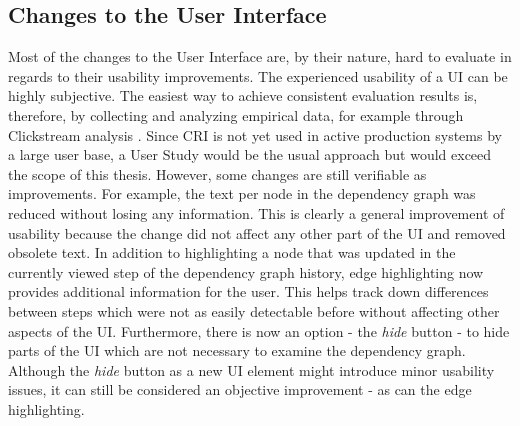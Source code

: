 	\subsection{Changes to the User Interface}
	Most of the changes to the User Interface are, by their nature, hard to evaluate in regards to their usability improvements. The experienced usability of a UI can be highly subjective. The easiest way to achieve consistent evaluation results is, therefore, by collecting and analyzing empirical data, for example through Clickstream analysis \cite{Clickstream}. Since CRI is not yet used in active production systems by a large user base, a User Study would be the usual approach but would exceed the scope of this thesis. However, some changes are still verifiable as improvements. For example, the text per node in the dependency graph was reduced without losing any information. This is clearly a general improvement of usability because the change did not affect any other part of the UI and removed obsolete text. 
	In addition to highlighting a node that was updated in the currently viewed step of the dependency graph history, edge highlighting now provides additional information for the user. This helps track down differences between steps which were not as easily detectable before without affecting other aspects of the UI. Furthermore, there is now an option - the \emph{hide} button - to hide parts of the UI which are not necessary to examine the dependency graph. Although the \emph{hide} button as a new UI element might introduce minor usability issues, it can still be considered an objective improvement - as can the edge highlighting.
	

